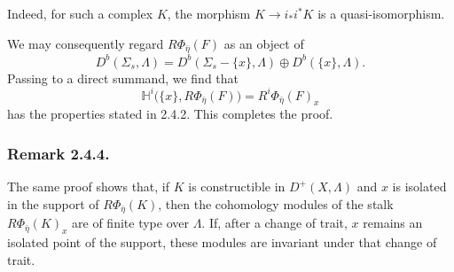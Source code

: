 Indeed, for such a complex $K$, the morphism
$K\longrightarrow i_*i^*K$ is a quasi-isomorphism.

We may consequently regard $R\Phi_{\bar\eta}(F)$ as an object of
\[
D^b(\Sigma_s,\Lambda)
=D^b(\Sigma_s-\{x\},\Lambda)\oplus D^b(\{x\},\Lambda).
\]
Passing to a direct summand, we find that
\[
\mathbb H^i\bigl(\{x\},R\Phi_{\bar\eta}(F)\bigr)
=R^i\Phi_{\bar\eta}(F)_x
\]
has the properties stated in 2.4.2.  This completes the proof.

\subsubsection*{Remark 2.4.4.}
The same proof shows that, if $K$ is constructible in
$D^+(X,\Lambda)$ and $x$ is isolated in the support of
$R\Phi_{\bar\eta}(K)$, then the cohomology modules of the stalk
$R\Phi_{\bar\eta}(K)_x$ are of finite type over $\Lambda$.  If, after
a change of trait, $x$ remains an isolated point of the support, these
modules are invariant under that change of trait.
